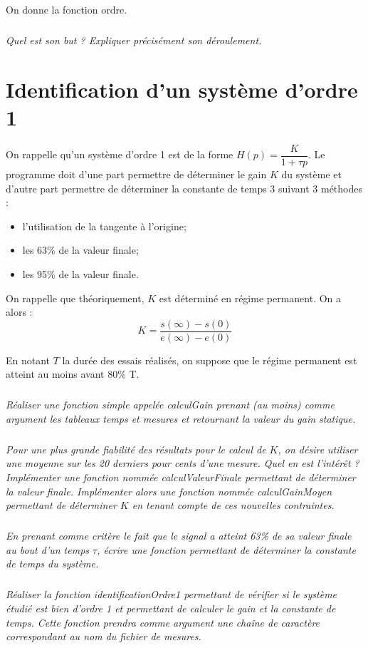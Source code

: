 \documentclass[10pt]{article}
\begin{document}
 
 On donne la fonction \textsf{ordre}. 
\begin{py}
\begin{python}
\end{python}
\end{py}
 
\subparagraph{}
\textit{Quel est son but ? Expliquer précisément son déroulement.}

\section{Identification d'un système d'ordre 1}
On rappelle qu'un système d'ordre 1 est de la forme $H(p)=\dfrac{K}{1 + \tau p}$. Le programme doit d'une part permettre de déterminer le gain $K$ du système et d'autre part permettre de déterminer la constante de temps 3 suivant 3 méthodes : 
\begin{itemize}
\item l'utilisation de la tangente à l'origine;
\item les 63\% de la valeur finale;
\item les 95\% de la valeur finale. 
\end{itemize}

On rappelle que théoriquement, $K$ est déterminé en régime permanent. On a alors : 
$$
K = \dfrac{s(\infty)-s(0)}{e(\infty)-e(0)}
$$

En notant $T$ la durée des essais réalisés, on suppose que le régime permanent est atteint au moins avant 80\% T. 


\subparagraph{}
\textit{Réaliser une fonction simple appelée \textsl{calculGain} prenant (au moins) comme argument les tableaux \textsl{temps} et \textsl{mesures} et retournant la valeur du gain statique.}

\subparagraph{}
\textit{Pour une plus grande fiabilité des résultats pour le calcul de $K$, on désire utiliser une moyenne sur les 20 derniers pour cents d'une mesure. Quel en est l'intérêt ? Implémenter une fonction nommée \textsl{calculValeurFinale} permettant de déterminer la valeur finale. Implémenter alors une fonction nommée  \textsl{calculGainMoyen} permettant de déterminer $K$ en tenant compte de ces nouvelles contraintes.}

\subparagraph{}
\textit{En prenant comme critère le fait que le signal a atteint 63\% de sa valeur finale au bout d'un temps $\tau$, écrire une fonction permettant de déterminer la constante de temps du système.}


\subparagraph{}
\textit{Réaliser la fonction \textsf{identificationOrdre1} permettant de vérifier si le système étudié est bien d'ordre 1 et permettant de calculer le gain et la constante de temps. Cette fonction prendra comme argument une chaîne de caractère correspondant au nom du fichier de mesures. }
\end{document}
